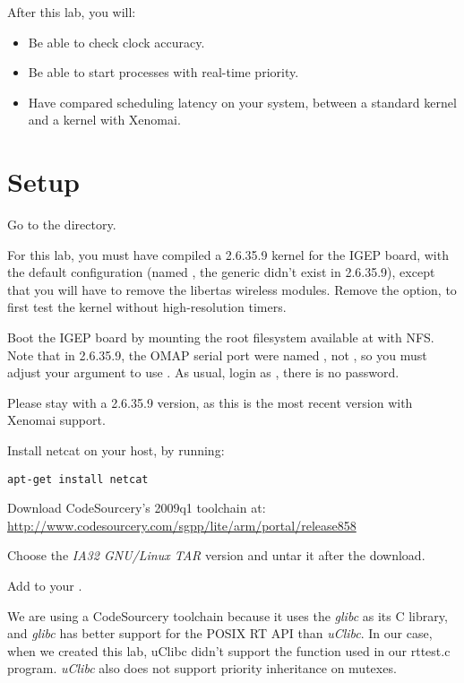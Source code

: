 
After this lab, you will:
\begin{itemize}
\item Be able to check clock accuracy.
\item Be able to start processes with real-time priority.
\item Have compared scheduling latency on your system, between a standard kernel and a kernel with Xenomai.
\end{itemize}

\section{Setup}

Go to the  directory.

For this lab, you must have compiled a 2.6.35.9 kernel for the IGEP
board, with the default configuration (named
, the generic 
didn't exist in 2.6.35.9), except that you will have to remove the
libertas wireless modules. Remove the 
option, to first test the kernel without high-resolution timers.

Boot the IGEP board by mounting the root filesystem available at
 with NFS. Note
that in 2.6.35.9, the OMAP serial port were named , not
, so you must adjust your  argument to use
. As usual, login as , there is no password.

Please stay with a 2.6.35.9 version, as this is the most recent
version with Xenomai support.

Install netcat on your host, by running:
\begin{verbatim}
apt-get install netcat
\end{verbatim}

Download CodeSourcery's 2009q1 toolchain at:
\url{http://www.codesourcery.com/sgpp/lite/arm/portal/release858}

Choose the {\em IA32 GNU/Linux TAR} version and untar it after the
download.

Add  to your
.

We are using a CodeSourcery toolchain because it uses the {\em glibc}
as its C library, and {\em glibc} has better support for the POSIX RT
API than {\em uClibc}. In our case, when we created this lab, uClibc
didn't support the  function used in our
rttest.c program. {\em uClibc} also does not support priority
inheritance on mutexes.

